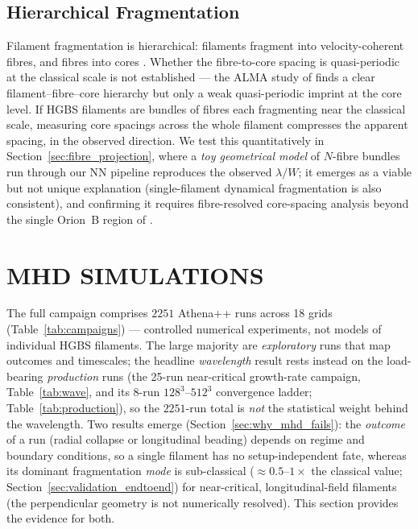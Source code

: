 \documentclass[usenatbib,twoside,twocolumn]{mnras}
\begin{document}
\subsection{Hierarchical Fragmentation}

Filament fragmentation is hierarchical: filaments fragment into velocity-coherent fibres, and fibres into cores \citep{Hacar2013,Hacar2018,Yang2024}. Whether the fibre-to-core spacing is quasi-periodic at the classical scale is not established --- the ALMA study of \citet{Yang2024} finds a clear filament--fibre--core hierarchy but only a weak quasi-periodic imprint at the core level. If HGBS filaments are bundles of fibres each fragmenting near the classical scale, measuring core spacings across the whole filament compresses the apparent spacing, in the observed direction. We test this quantitatively in Section~\ref{sec:fibre_projection}, where a \emph{toy geometrical model} of $N$-fibre bundles run through our NN pipeline reproduces the observed $\lambda/W$; it emerges as a viable but not unique explanation (single-filament dynamical fragmentation is also consistent), and confirming it requires fibre-resolved core-spacing analysis beyond the single Orion~B region of \citet{Yang2024}.

\section{MHD SIMULATIONS}

The full campaign comprises $2251$ Athena++ runs across 18 grids (Table~\ref{tab:campaigns}) --- controlled numerical experiments, not models of individual HGBS filaments. The large majority are \emph{exploratory} runs that map outcomes and timescales; the headline \emph{wavelength} result rests instead on the load-bearing \emph{production} runs (the 25-run near-critical growth-rate campaign, Table~\ref{tab:wave}, and its 8-run $128^3$--$512^3$ convergence ladder; Table~\ref{tab:production}), so the $2251$-run total is \emph{not} the statistical weight behind the wavelength. Two results emerge (Section~\ref{sec:why_mhd_fails}): the \emph{outcome} of a run (radial collapse or longitudinal beading) depends on regime and boundary conditions, so a single filament has no setup-independent fate, whereas its dominant fragmentation \emph{mode} is sub-classical ($\approx0.5$--$1\times$ the classical value; Section~\ref{sec:validation_endtoend}) for near-critical, longitudinal-field filaments (the perpendicular geometry is not numerically resolved). This section provides the evidence for both.
\end{document}
